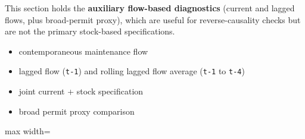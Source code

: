 \documentclass[
  11pt,
]{article}
\providecommand{\tightlist}{%
  \setlength{\itemsep}{0pt}\setlength{\parskip}{0pt}}
\begin{document}
This section holds the \textbf{auxiliary flow-based diagnostics}
(current and lagged flows, plus broad-permit proxy), which are useful
for reverse-causality checks but are not the primary stock-based
specifications.

\begin{itemize}
\tightlist
\item
  contemporaneous maintenance flow
\item
  lagged flow (\texttt{t-1}) and rolling lagged flow average
  (\texttt{t-1} to \texttt{t-4})
\item
  joint current + stock specification
\item
  broad permit proxy comparison
\end{itemize}

\begin{adjustbox}{max width=\textwidth}


\end{adjustbox}
\end{document}
